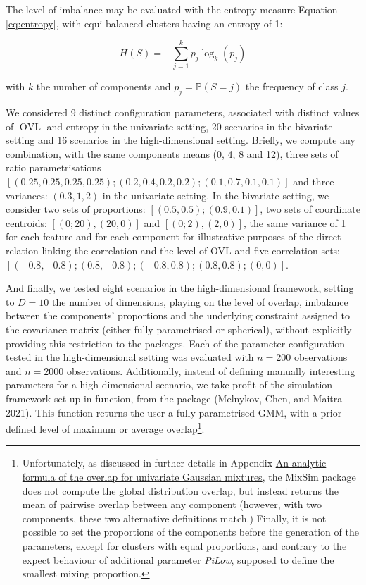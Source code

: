 The level of imbalance may be evaluated with the entropy measure Equation \eqref{eq:entropy}, with equi-balanced clusters having an entropy of 1:

\begin{equation}
    H(S)=-\sum_{j=1}^k p_j \log_k (p_j)
\label{eq:entropy}
\end{equation}

with \(k\) the number of components and \(p_j=\mathbb{P}(S=j)\) the frequency of class \(j\).

We considered 9 distinct configuration parameters, associated with distinct values of \(\operatorname{OVL}\) and entropy in the univariate setting, 20 scenarios in the bivariate setting and 16 scenarios in the high-dimensional setting. Briefly, we compute any combination, with the same components means (0, 4, 8 and 12), three sets of ratio parametrisations \(\left[(0.25, 0.25, 0.25, 0.25); (0.2, 0.4, 0.2, 0.2); (0.1, 0.7, 0.1, 0.1) \right]\) and three variances: \((0.3, 1, 2)\) in the univariate setting. In the bivariate setting, we consider two sets of proportions: \(\left[(0.5, 0.5); (0.9, 0.1) \right]\), two sets of coordinate centroids: \(\left[(0; 20), (20, 0) \right]\) and \(\left[(0; 2), (2, 0) \right]\), the same variance of 1 for each feature and for each component for illustrative purposes of the direct relation linking the correlation and the level of OVL and five correlation sets:\([(-0.8, -0.8); (0.8, -0.8);\allowbreak (-0.8, 0.8); (0.8, 0.8); (0, 0)]\).

\color{blue}And finally, we tested eight scenarios in the high-dimensional framework, setting to \(D=10\) the number of dimensions, playing on the level of overlap, imbalance between the components' proportions and the underlying constraint assigned to the covariance matrix (either fully parametrised or spherical), without explicitly providing this restriction to the packages. Each of the parameter configuration tested in the high-dimensional setting was evaluated with \(n=200\) observations and \(n=2000\) observations. Additionally, instead of defining manually interesting parameters for a high-dimensional scenario, we take profit of the simulation framework set up in  function, from the  package (Melnykov, Chen, and Maitra 2021). This function returns the user a fully parametrised GMM, with a prior defined level of maximum or average overlap\footnote{Unfortunately, as discussed in further details in Appendix \protect\hyperlink{an-analytic-formula-of-the-overlap-for-univariate-gaussian-mixtures}{An analytic formula of the overlap for univariate Gaussian mixtures}, the MixSim package does not compute the global distribution overlap, but instead returns the mean of pairwise overlap between any component (however, with two components, these two alternative definitions match.) Finally, it is not possible to set the proportions of the components before the generation of the parameters, except for clusters with equal proportions, and contrary to the expect behaviour of additional parameter \emph{PiLow}, supposed to define the smallest mixing proportion.}.
\color{black}

